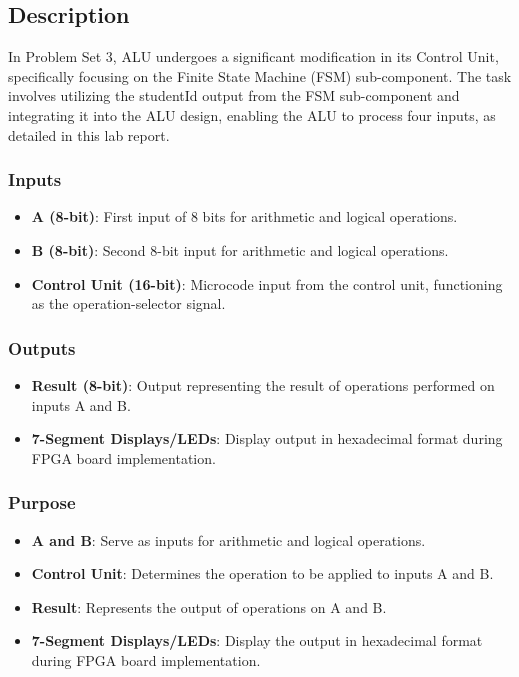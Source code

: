 
\subsection{{Description}}

    {In Problem Set 3, ALU undergoes a significant modification in its Control Unit, specifically focusing on the Finite State Machine (FSM) sub-component. The task involves utilizing the studentId output from the FSM sub-component and integrating it into the ALU design, enabling the ALU to process four inputs, as detailed in this lab report.}

    \subsubsection{{Inputs}}

        \begin{itemize}
            \item   {\textbf{A (8-bit)}: First input of 8 bits for arithmetic and logical operations.}
            \item   {\textbf{B (8-bit)}: Second 8-bit input for arithmetic and logical operations.}
            \item   {\textbf{Control Unit (16-bit)}: Microcode input from the control unit, functioning as the operation-selector signal.}
        \end{itemize}

    \subsubsection{{Outputs}}

        \begin{itemize}
            \item   {\textbf{Result (8-bit)}: Output representing the result of operations performed on inputs A and B.}
            \item   {\textbf{7-Segment Displays/LEDs}: Display output in hexadecimal format during FPGA board implementation.}
        \end{itemize}

    \subsubsection{{Purpose}}

        \begin{itemize}
            \item   {\textbf{A and B}: Serve as inputs for arithmetic and logical operations.}
            \item   {\textbf{Control Unit}: Determines the operation to be applied to inputs A and B.}
            \item   {\textbf{Result}: Represents the output of operations on A and B.}
            \item   {\textbf{7-Segment Displays/LEDs}: Display the output in hexadecimal format during FPGA board implementation.}
        \end{itemize}
    

